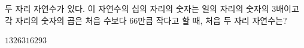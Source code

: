 두 자리 자연수가 있다. 이 자연수의 십의 자리의 숫자는 일의 자리의 숫자의 $3$배이고 각 자리의 숫자의 곱은 처음 수보다 $66$만큼 작다고 할 때, 처음 두 자리 자연수는?
\begin{choices32}{$13$}{$26$}{$31$}{$62$}{$93$}\end{choices32}
